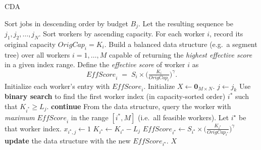 \documentclass{article}
\begin{document}
\begin{algorithm}[H]
\caption{\textsc{CDA}}
\label{alg:degrading}
\begin{algorithmic}[1]

\State Sort jobs in descending order by budget $B_j$. Let the resulting sequence be $j_1,j_2,\dots,j_N$.
\State Sort workers by ascending capacity. For each worker $i$, record its original capacity $\mathit{OrigCap}_i = K_i$.
\State Build a balanced data structure (e.g.\ a segment tree) over all workers $i=1,\dots,M$ capable of returning the \emph{highest effective score} in a given index range. 
\State Define the \emph{effective score} of worker $i$ as
  \[
  \mathit{EffScore}_i \;=\; S_i \times \bigl(\tfrac{K_i}{\mathit{OrigCap}_i}\bigr)^\gamma.
  \]
  Initialize each worker's entry with $\mathit{EffScore}_i$.
\State Initialize $X \gets \mathbf{0}_{M\times N}$.
    \State $j \gets j_k$ \quad {}
    \State Use \textbf{binary search} to find the first worker index (in capacity-sorted order) $i^*$ such that $K_{i^*}\ge L_j$. 
        \State \textbf{continue} 
    \EndIf
    \State From the data structure, query the worker with \emph{maximum} $\mathit{EffScore}_i$ in the range $[i^*, M]$ (i.e.\ all feasible workers).
    \State Let $i^\star$ be that worker index. \quad {}
        \State $x_{i^\star,j} \gets 1$  
        \State $K_{i^\star} \gets K_{i^\star} - L_j$  
        \State $\mathit{EffScore}_{i^\star} \gets S_{i^\star}\times \bigl(\tfrac{K_{i^\star}}{\mathit{OrigCap}_{i^\star}}\bigr)^\gamma$ 
        \State \textbf{update} the data structure with the new $\mathit{EffScore}_{i^\star}$.
    \EndIf
\EndFor
\State \Return $X$
\end{algorithmic}
\end{algorithm}
\end{document}
